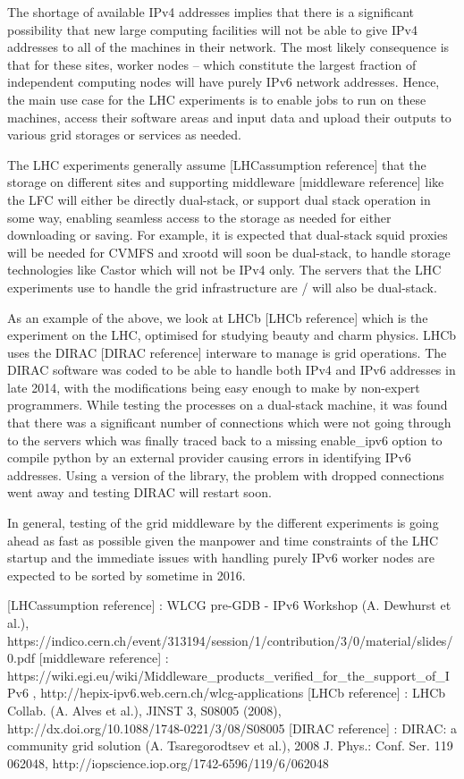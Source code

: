 

The shortage of available IPv4 addresses implies that there is a significant possibility that new large
computing facilities will not be able to give IPv4 addresses to all of the machines in their network. The
most likely consequence is that for these sites, worker nodes -- which constitute the largest fraction of
independent computing nodes will have purely IPv6 network addresses. Hence, the main use case for the LHC
experiments is to enable jobs to run on these machines, access their software areas and input data and
upload their outputs to various grid storages or services as needed.

The LHC experiments generally assume [LHCassumption reference] that the storage on different sites and
supporting middleware [middleware reference] like the LFC will either be directly dual-stack, or support
dual stack operation in some way, enabling seamless access to the storage as needed for either downloading
or saving. For example, it is expected that dual-stack squid proxies will be needed for CVMFS and xrootd
will soon be dual-stack, to handle storage technologies like Castor which will not be IPv4 only. The
servers that the LHC experiments use to handle the grid infrastructure are / will also be dual-stack.

As an example of the above, we look at LHCb [LHCb reference] which is the experiment on the LHC, optimised
for studying beauty and charm physics. LHCb uses the DIRAC [DIRAC reference] interware to manage is grid
operations. The DIRAC software was coded to be able to handle both IPv4 and IPv6 addresses in late 2014,
with the modifications being easy enough to make by non-expert programmers. While testing the processes
on a dual-stack machine, it was found that there was a significant number of connections which were not
going through to the servers which was finally traced back to a missing enable\_ipv6 option to compile python
by an external provider causing errors in identifying IPv6 addresses. Using a version of the library, the
problem with dropped connections went away and testing DIRAC will restart soon.

In general, testing of the grid middleware by the different experiments is going ahead as fast as possible
given the manpower and time constraints of the LHC startup and the immediate issues with handling purely
IPv6 worker nodes are expected to be sorted by sometime in 2016.

[LHCassumption reference] : WLCG pre-GDB - IPv6 Workshop (A. Dewhurst et al.), https://indico.cern.ch/event/313194/session/1/contribution/3/0/material/slides/0.pdf
[middleware reference] : https://wiki.egi.eu/wiki/Middleware\_products\_verified\_for\_the\_support\_of\_IPv6 , http://hepix-ipv6.web.cern.ch/wlcg-applications
[LHCb reference] : LHCb Collab. (A. Alves et al.), JINST 3, S08005 (2008), http://dx.doi.org/10.1088/1748-0221/3/08/S08005
[DIRAC reference] : DIRAC: a community grid solution (A. Tsaregorodtsev et al.), 2008 J. Phys.: Conf. Ser. 119 062048, http://iopscience.iop.org/1742-6596/119/6/062048


